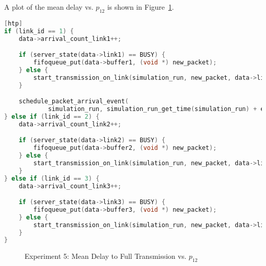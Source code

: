 A plot of the mean delay vs. $p_{12}$ is shown in Figure~\ref{fig:exp5}.

\begin{lstlisting}[language=C, caption={Modifications to Experiment 5 Code}, label={list:exp5}][htp]
if (link_id == 1) {
    data->arrival_count_link1++;

    if (server_state(data->link1) == BUSY) {
        fifoqueue_put(data->buffer1, (void *) new_packet);
    } else {
        start_transmission_on_link(simulation_run, new_packet, data->link1);
    }

    schedule_packet_arrival_event(
            simulation_run, simulation_run_get_time(simulation_run) + exponential_generator((double) 1 / LINK1_PACKET_ARRIVAL_RATE), 1);
} else if (link_id == 2) {
    data->arrival_count_link2++;

    if (server_state(data->link2) == BUSY) {
        fifoqueue_put(data->buffer2, (void *) new_packet);
    } else {
        start_transmission_on_link(simulation_run, new_packet, data->link2);
    }
} else if (link_id == 3) {
    data->arrival_count_link3++;

    if (server_state(data->link3) == BUSY) {
        fifoqueue_put(data->buffer3, (void *) new_packet);
    } else {
        start_transmission_on_link(simulation_run, new_packet, data->link3);
    }
}
\end{lstlisting}

\begin{figure}[htp]
\centering
{}
\caption{Experiment 5: Mean Delay to Full Transmission vs. $p_{12}$}
\label{fig:exp5}
\end{figure}